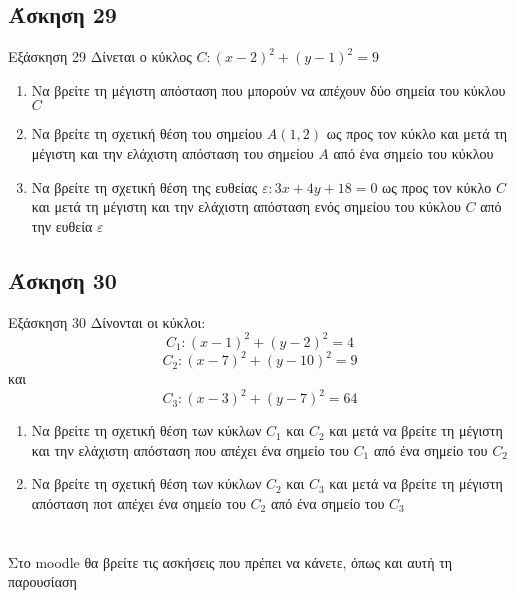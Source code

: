 \documentclass[greek]{beamer}
\begin{document}
\subsection{Άσκηση 29}
\begin{frame}[label=Άσκηση29,t]{Εξάσκηση 29}
  Δίνεται ο κύκλος $C:(x-2)^2+(y-1)^2=9$
  \begin{enumerate}
    \item<1-> Να βρείτε τη μέγιστη απόσταση που μπορούν να απέχουν δύο σημεία του κύκλου $C$
    \item<2-> Να βρείτε τη σχετική θέση του σημείου $Α(1,2)$ ως προς τον κύκλο και μετά τη μέγιστη και την ελάχιστη απόσταση του σημείου $Α$ από ένα σημείο του κύκλου
    \item<3-> Να βρείτε τη σχετική θέση της ευθείας $ε:3x+4y+18=0$ ως προς τον κύκλο $C$ και μετά τη μέγιστη και την ελάχιστη απόσταση ενός σημείου του κύκλου $C$ από την ευθεία $ε$
  \end{enumerate}

\end{frame}

\subsection{Άσκηση 30}
\begin{frame}[label=Άσκηση30,t]{Εξάσκηση 30}
  Δίνονται οι κύκλοι:
  $$C_1:(x-1)^2+(y-2)^2=4$$
  $$C_2:(x-7)^2+(y-10)^2=9$$
  και
  $$C_3:(x-3)^2+(y-7)^2=64$$
  \begin{enumerate}
    \item<1-> Να βρείτε τη σχετική θέση των κύκλων $C_1$ και $C_2$ και μετά να βρείτε τη μέγιστη και την ελάχιστη απόσταση που απέχει ένα σημείο του $C_1$ από ένα σημείο του $C_2$
    \item<2-> Να βρείτε τη σχετική θέση των κύκλων $C_2$ και $C_3$ και μετά να βρείτε τη μέγιστη απόσταση ποτ απέχει ένα σημείο του $C_2$ από ένα σημείο του $C_3$
  \end{enumerate}

\end{frame}

\appendix

\section{}
\begin{frame}
Στο moodle θα βρείτε τις ασκήσεις που πρέπει να κάνετε, όπως και αυτή τη παρουσίαση
\end{frame}
\end{document}
